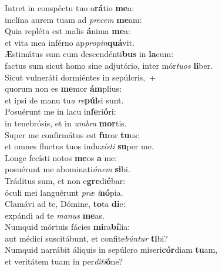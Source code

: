 \evenverse Intret in conspéctu tuo o\textbf{rá}tio \textbf{me}a:~\*\\
\evenverse inclína aurem tuam ad \textit{pre}\textit{cem} \textbf{me}am:\\
\oddverse Quia repléta est malis \textbf{á}nima \textbf{me}a:~\*\\
\oddverse et vita mea inférno ap\textit{pro}\textit{pin}\textbf{quá}vit.\\
\evenverse Æstimátus sum cum descendénti\textbf{bus} in \textbf{la}cum:~\*\\
\evenverse factus sum sicut homo sine adjutório, inter mór\textit{tu}\textit{os} \textbf{li}ber.\\
\oddverse Sicut vulneráti dormiéntes in sepúlcris,~+\\
\oddverse  quorum non es \textbf{me}mor \textbf{ám}plius:~\*\\
\oddverse et ipsi de manu tu\textit{a} \textit{re}\textbf{púl}si sunt.\\
\evenverse Posuérunt me in lacu in\textbf{fe}ri\textbf{ó}ri:~\*\\
\evenverse in tenebrósis, et in \textit{um}\textit{bra} \textbf{mor}tis.\\
\oddverse Super me confirmátus est \textbf{fu}ror \textbf{tu}us:~\*\\
\oddverse et omnes fluctus tuos indu\textit{xí}\textit{sti} \textbf{su}per me.\\
\evenverse Longe fecísti notos \textbf{me}os \textbf{a} me:~\*\\
\evenverse posuérunt me abominati\textit{ó}\textit{nem} \textbf{si}bi.\\
\oddverse Tráditus sum, et non e\textbf{gre}di\textbf{é}bar:~\*\\
\oddverse óculi mei languérunt \textit{præ} \textit{i}\textbf{nó}pia.\\
\evenverse Clamávi ad te, Dómine, \textbf{to}ta \textbf{di}e:~\*\\
\evenverse expándi ad te \textit{ma}\textit{nus} \textbf{me}as.\\
\oddverse Numquid mórtuis fácies \textbf{mi}ra\textbf{bí}lia:~\*\\
\oddverse aut médici suscitábunt, et confite\textit{bún}\textit{tur} \textbf{ti}bi?\\
\evenverse Numquid narrábit áliquis in sepúlcro miseri\textbf{cór}diam \textbf{tu}am,~\*\\
\evenverse et veritátem tuam in per\textit{di}\textit{ti}\textbf{ó}ne?\\
